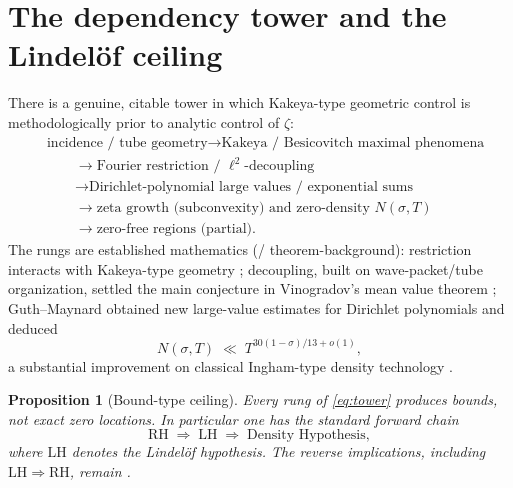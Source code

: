 \documentclass[11pt]{amsart}
\theoremstyle{plain}
\newtheorem{proposition}[theorem]{Proposition}
\theoremstyle{definition}
\newcommand{\RH}{\mathrm{RH}}
\newcommand{\LH}{\mathrm{LH}}
\newcommand{\NsigT}{N(\sigma,T)}
\begin{document}
\section{The dependency tower and the Lindel\"of ceiling}
\label{sec:tower}

There is a genuine, citable tower in which Kakeya-type geometric control is
methodologically prior to analytic control of $\zeta$:
\begin{equation}
\label{eq:tower}
\begin{aligned}
&\text{incidence / tube geometry}
  \longrightarrow
\text{Kakeya / Besicovitch maximal phenomena}
\\
&\qquad\longrightarrow
\text{Fourier restriction / }\ell^2\text{-decoupling}
\\
&\qquad\longrightarrow
\text{Dirichlet-polynomial large values / exponential sums}
\\
&\qquad\longrightarrow
\text{zeta growth (subconvexity) and zero-density }\NsigT
\\
&\qquad\longrightarrow
\text{zero-free regions (partial)}.
\end{aligned}
\end{equation}
The rungs are established mathematics (\PeAIceKnown / theorem-background):
restriction interacts with Kakeya-type geometry \cite{Bourgain1991};
decoupling, built on wave-packet/tube organization, settled the main conjecture
in Vinogradov's mean value theorem \cite{BourgainDemeterGuth2016};
Guth--Maynard obtained new large-value estimates for Dirichlet polynomials and
deduced
\begin{equation}
  \label{eq:GM}
  \NsigT \;\ll\; T^{30(1-\sigma)/13+o(1)},
\end{equation}
a substantial improvement on classical Ingham-type density technology
\cite{GuthMaynard2024,Ingham1940}.

\begin{proposition}[Bound-type ceiling]
\label{prop:ceiling}
Every rung of \eqref{eq:tower} produces \emph{bounds}, not exact zero locations.
In particular one has the standard forward chain
\begin{equation}
  \RH \;\Longrightarrow\; \LH \;\Longrightarrow\; \text{Density Hypothesis},
\end{equation}
where $\LH$ denotes the Lindel\"of hypothesis.
The reverse implications, including $\LH\Rightarrow\RH$, remain \PeAIceOpen.
\end{proposition}
\end{document}
